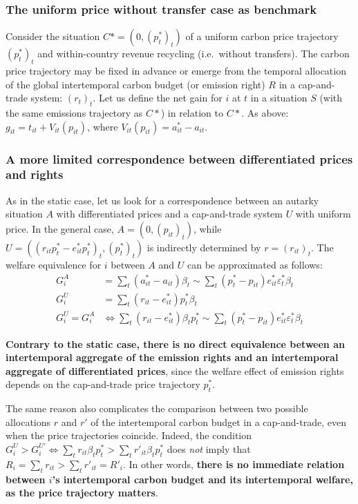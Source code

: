 \documentclass[12pt,english]{article}
\begin{document}
\subsubsection*{The uniform price without transfer case as
benchmark}\label{the-uniform-price-without-transfer-case-as-benchmark}

Consider the situation $C*=(0,(p^*_t)_t)$ of a uniform carbon price
trajectory $(p^*_t)_t$ and within-country revenue recycling
(i.e.~without transfers). The carbon price trajectory may be fixed in
advance or emerge from the temporal allocation of the global
intertemporal carbon budget (or emission right) $R$ in a cap-and-trade
system: $(r_{t})_t$. Let us define the net gain for $i$ at $t$ in
a situation $S$ (with the same emissions trajectory as $C*$) in
relation to $C*$. As above: $g_{it} = t_{it} + V_{it}(p_{it})$,
where $V_{it}(p_{it}) = a^*_{it} - a_{it}$.

\subsubsection*{A more limited correspondence between differentiated
prices and
rights}\label{a-more-limited-correspondence-between-differentiated-prices-and-rights}

As in the static case, let us look for a correspondence between an
autarky situation $A$ with differentiated prices and a cap-and-trade
system $U$ with uniform price. In the general case,
$A=(0, (p_{it})_t)$, while
$U=((r_{it}p^*_t-e^*_{it}p^*_t)_t, (p^*_t)_t)$ is indirectly
determined by $r=(r_{it})_t$. The welfare equivalence for $i$ between $A$ and $U$ can be approximated as follows: 
$$\begin{aligned}
G^A_i &= \sum_t (a^*_{it} - a_{it})\beta_t \sim \sum_t (p^*_t - p_{it}) e^*_{it}  \varepsilon^*_t \beta_t \\
G^U_i &= \sum_t (r_{it} - e^*_{it}) p^*_t \beta_t \\
G^U_i = G^A_i &\Leftrightarrow \sum_t (r_{it} - e^*_{it}) \beta_t p^*_t  \sim \sum_t (p^*_t - p_{it}) e^*_{it}  \varepsilon^*_t \beta_t
\end{aligned}$$

\textbf{Contrary to the static case, there is no direct equivalence
between an intertemporal aggregate of the emission rights and an
intertemporal aggregate of differentiated prices}, since the welfare
effect of emission rights depends on the cap-and-trade price trajectory
$p^*_t$.

The same reason also complicates the comparison between two possible
allocations $r$ and $r'$ of the intertemporal carbon budget in a
cap-and-trade, even when the price trajectories coincide. Indeed, the
condition
$G^U_i > G^{U'}_i \Leftrightarrow \sum_t r_{it} \beta_t p^*_t > \sum_t r'_{it} \beta_t p^*_t$
does \emph{not} imply that
$R_i = \sum_t r_{it} > \sum_t r'_{it} = R'_i$. In other words,
\textbf{there is no immediate relation between $i$'s intertemporal
carbon budget and its intertemporal welfare, as the price trajectory
matters}.
\end{document}

